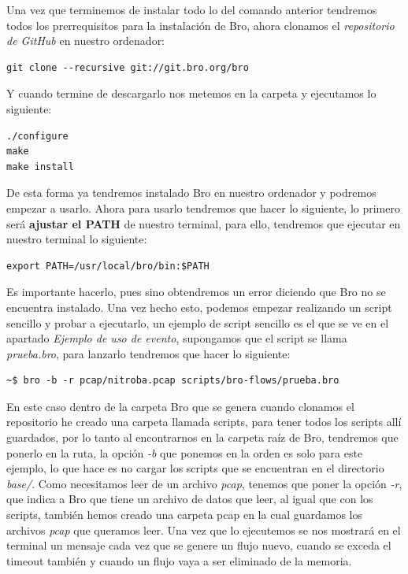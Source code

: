 Una vez que terminemos de instalar todo lo del comando anterior tendremos todos los 
prerrequisitos para la instalación de Bro, ahora clonamos el 
\textit{repositorio de GitHub} en nuestro ordenador:
\intro
\begin{lstlisting}[style=Consola]
git clone --recursive git://git.bro.org/bro
\end{lstlisting}

Y cuando termine de descargarlo nos metemos en la carpeta y ejecutamos lo siguiente:
\intro
\begin{lstlisting}[style=Consola]
./configure
make
make install
\end{lstlisting}

De esta forma ya tendremos instalado Bro en nuestro ordenador y podremos empezar 
a usarlo.
\intro
Ahora para usarlo tendremos que hacer lo siguiente, lo primero será \textbf{ajustar el 
PATH} de nuestro terminal, para ello, tendremos que ejecutar en nuestro terminal 
lo siguiente:
\intro
\begin{lstlisting}[style=Consola]
export PATH=/usr/local/bro/bin:$PATH
\end{lstlisting}

Es importante hacerlo, pues sino obtendremos un error diciendo que Bro no se 
encuentra instalado. Una vez hecho esto, podemos empezar realizando un script 
sencillo y probar a ejecutarlo, un ejemplo de script sencillo es el que se ve 
en el apartado \textit{Ejemplo  de uso de evento}, 
supongamos que el script se llama \textit{prueba.bro}, para lanzarlo tendremos 
que hacer lo siguiente:
\intro
\begin{lstlisting}[style=Consola]
~$ bro -b -r pcap/nitroba.pcap scripts/bro-flows/prueba.bro
\end{lstlisting}

En este caso dentro de la carpeta Bro que se genera cuando clonamos el 
repositorio he creado una carpeta llamada scripts, para tener todos los 
scripts allí guardados, por lo tanto al encontrarnos en la carpeta raíz 
de Bro, tendremos que ponerlo en la ruta, la opción \textit{-b} que ponemos en la 
orden es solo para este ejemplo, lo que hace es no cargar los scripts 
que se encuentran en el directorio \textit{base/}. Como necesitamos leer de un 
archivo \textit{pcap}, tenemos que poner la opción \textit{-r}, que indica a Bro que tiene 
un archivo de datos que leer, al igual que con los scripts, también hemos 
creado una carpeta pcap en la cual guardamos los archivos \textit{pcap} que queramos 
leer. Una vez que lo ejecutemos se nos mostrará en el terminal un mensaje 
cada vez que se genere un flujo nuevo, cuando se exceda el timeout también 
y cuando un flujo vaya a ser eliminado de la memoria.

